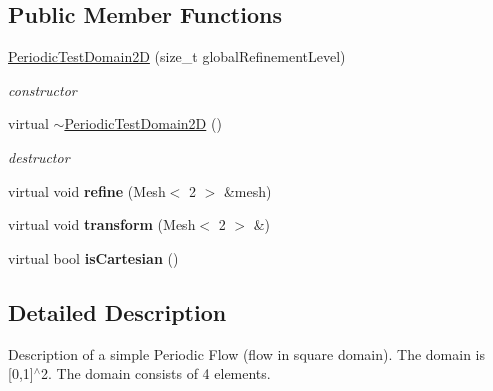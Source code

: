 \subsection*{Public Member Functions}
\begin{DoxyCompactItemize}
\item 
\hyperlink{classnatrium_1_1PeriodicTestDomain2D_a930da37a3e1be744aaf59e27ba956318}{PeriodicTestDomain2D} (size\_\-t globalRefinementLevel)
\begin{DoxyCompactList}\small\item\em constructor \item\end{DoxyCompactList}\item 
\hypertarget{classnatrium_1_1PeriodicTestDomain2D_a81fe3504b294cd4d6219c360f465f84b}{
virtual \hyperlink{classnatrium_1_1PeriodicTestDomain2D_a81fe3504b294cd4d6219c360f465f84b}{$\sim$PeriodicTestDomain2D} ()}
\label{classnatrium_1_1PeriodicTestDomain2D_a81fe3504b294cd4d6219c360f465f84b}

\begin{DoxyCompactList}\small\item\em destructor \item\end{DoxyCompactList}\item 
\hypertarget{classnatrium_1_1PeriodicTestDomain2D_a2585d064816ca884d12586da93388a48}{
virtual void {\bfseries refine} (Mesh$<$ 2 $>$ \&mesh)}
\label{classnatrium_1_1PeriodicTestDomain2D_a2585d064816ca884d12586da93388a48}

\item 
\hypertarget{classnatrium_1_1PeriodicTestDomain2D_a1a6e52d1a6b3f09332158ecbf19eab6e}{
virtual void {\bfseries transform} (Mesh$<$ 2 $>$ \&)}
\label{classnatrium_1_1PeriodicTestDomain2D_a1a6e52d1a6b3f09332158ecbf19eab6e}

\item 
\hypertarget{classnatrium_1_1PeriodicTestDomain2D_a4f091b648af90aae6172ef0b24c304ff}{
virtual bool {\bfseries isCartesian} ()}
\label{classnatrium_1_1PeriodicTestDomain2D_a4f091b648af90aae6172ef0b24c304ff}

\end{DoxyCompactItemize}


\subsection{Detailed Description}
Description of a simple Periodic Flow (flow in square domain). The domain is \mbox{[}0,1\mbox{]}$^\wedge$2. The domain consists of 4 elements. 

